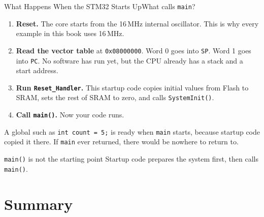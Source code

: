 \documentclass[9pt,aspectratio=169,xcolor=table]{beamer}
\begin{document}
\begin{frame}{What Happens When the STM32 Starts Up}{What calls \texttt{main}?}
    \leavevmode
    \begin{center}
    \end{center}

    \vspace{1mm}
    {\small
    \begin{enumerate}\itemsep2pt
        \item \textbf{Reset.} The core starts from the 16\,MHz internal oscillator. This is why every example in this book uses 16\,MHz.
        \item \textbf{Read the vector table} at \texttt{0x08000000}. Word 0 goes into \texttt{SP}. Word 1 goes into \texttt{PC}. No software has run yet, but the CPU already has a stack and a start address.
        \item \textbf{Run \texttt{Reset\_Handler}.} This startup code copies initial values from Flash to SRAM, sets the rest of SRAM to zero, and calls \texttt{SystemInit()}.
        \item \textbf{Call \texttt{main()}.} Now your code runs.
    \end{enumerate}}

    \vspace{1mm}
    {\small A global such as \texttt{int count = 5;} is ready when \texttt{main} starts, because startup code copied it there. If \texttt{main} ever returned, there would be nowhere to return to.}

    \vspace{1mm}
    \begin{block}{\texttt{main()} is not the starting point}
        Startup code prepares the system first, then calls \texttt{main()}.
    \end{block}
\end{frame}


\section{Summary}
\end{document}
